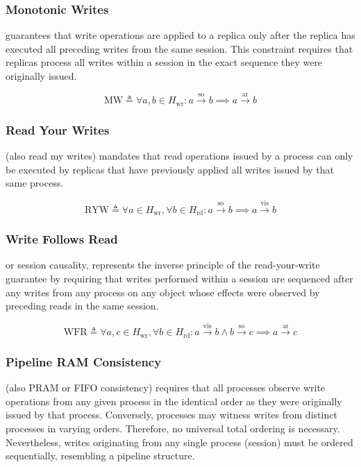 \subsubsection{Monotonic Writes} guarantees that write operations are
applied to a replica
only after the replica has executed all preceding writes from the same session.
This constraint requires that replicas process all writes within a session
in the exact sequence they were originally issued.

$$
\text{MW} \triangleq \forall a, b \in H_\text{wr}: a
\xrightarrow{\text{so}} b \implies a \xrightarrow{\text{ar}} b
$$

\subsubsection{Read Your Writes} (also read my writes)
mandates that read
operations issued by a process can only be executed by replicas that have
previously applied all writes issued by that same process.

$$
\text{RYW} \triangleq \forall a \in H_\text{wr}, \forall b \in
H_\text{rd}: a \xrightarrow{\text{so}} b \implies a \xrightarrow{\text{vis}} b
$$

\subsubsection{Write Follows Read} or session causality, represents the
inverse principle of the read-your-write guarantee by requiring that
writes performed
within a session are sequenced after any writes from any process on any
object whose effects were observed by preceding reads in the same session.

$$
\text{WFR} \triangleq \forall a, c \in H_\text{wr}, \forall b \in
H_\text{rd}: a \xrightarrow{\text{vis}} b \land b
\xrightarrow{\text{so}} c \implies a \xrightarrow{\text{ar}} c
$$

\subsubsection{Pipeline RAM Consistency} (also PRAM or FIFO
consistency) requires
that all processes observe write
operations from any given process in the identical order as they were
originally issued by
that process. Conversely, processes may witness writes from
distinct processes in varying orders. Therefore, no universal total ordering is
necessary. Nevertheless, writes originating from any single process
(session) must be
ordered sequentially, resembling a pipeline structure.

